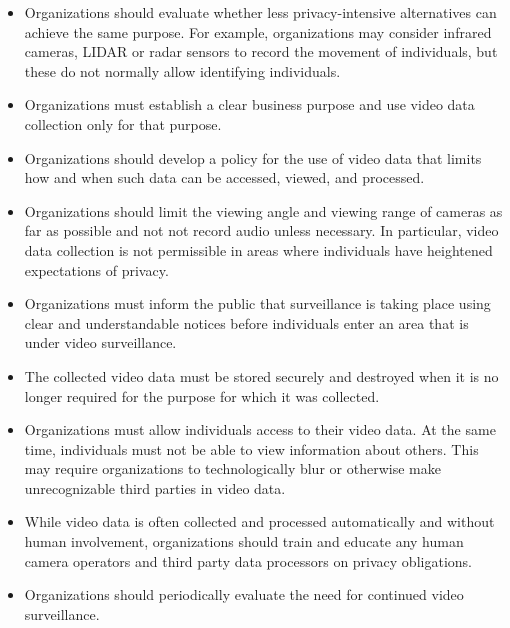 \begin{itemize}
   \item Organizations should evaluate whether less privacy-intensive alternatives can achieve the same purpose. For example, organizations may consider infrared cameras, LIDAR or radar sensors to record the movement of individuals, but these do not normally allow identifying individuals.
   \item Organizations must establish a clear business purpose and use video data collection only for that purpose.
   \item Organizations should develop a policy for the use of video data that limits how and when such data can be accessed, viewed, and processed.
   \item Organizations should limit the viewing angle and viewing range of cameras as far as possible and not not record audio unless necessary. In particular, video data collection is not permissible in areas where individuals have heightened expectations of privacy.
   \item Organizations must inform the public that surveillance is taking place using clear and understandable notices before individuals enter an area that is under video surveillance.
   \item The collected video data must be stored securely and destroyed when it is no longer required for the purpose for which it was collected.
   \item Organizations must allow individuals access to their video data. At the same time, individuals must not be able to view information about others. This may require organizations to technologically blur or otherwise make unrecognizable third parties in video data.
   \item While video data is often collected and processed automatically and without human involvement, organizations should train and educate any human camera operators and third party data processors on privacy obligations. 
   \item Organizations should periodically evaluate the need for continued video surveillance.
\end{itemize}

